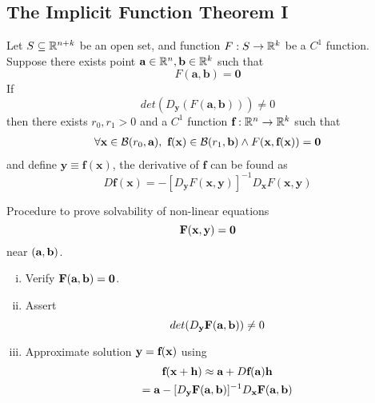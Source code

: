 \documentclass[11pt]{article}
\begin{document}
		\subsection{The Implicit Function Theorem I}
			\begin{theorem}
				Let $S \subseteq \mathbb{R}^{n+k}$ be an open set, and function $F: S \to \mathbb{R}^k$ be a $C^1$ function. Suppose there exists point $\textbf{a} \in \mathbb{R}^n, \textbf{b} \in \mathbb{R}^k$ such that 
				\begin{equation}
					F(\textbf{a}, \textbf{b}) = \textbf{0}
				\end{equation}
				If 
				\begin{equation}
					det(D_{\textbf{y}}(F(\textbf{a}, \textbf{b}))) \neq 0
				\end{equation}
				then there exists $r_0, r_1 > 0$ and a $C^1$ function $\textbf{f}: \mathbb{R}^n \to \mathbb{R}^k$ such that
				\begin{gather}
					\forall \ve{x} \in \mc{B}(r_0, \ve{a}),\ \ve{f}(\ve{x}) \in \mc{B}(r_1, \ve{b}) \land F(\ve{x}, \ve{f}(\ve{x})) = \ve{0}
				\end{gather}
				and define $\textbf{y} \equiv \textbf{f}(\textbf{x})$, the derivative of $\textbf{f}$ can be found as
				\begin{equation}
					D\textbf{f}(\textbf{x}) = -[D_{\textbf{y}}F(\textbf{x}, \textbf{y})]^{-1} D_{\textbf{x}}F(\textbf{x}, \textbf{y})
				\end{equation}
			\end{theorem}
			\begin{remark}
				Procedure to prove solvability of non-linear equations
				\begin{equation}
					\textbf{F}(\textbf{x}, \textbf{y}) = \textbf{0}
				\end{equation}
				near $(\textbf{a}, \textbf{b})$.
				\begin{enumerate}[(i)]
					\item Verify $\textbf{F}(\textbf{a}, \textbf{b}) = \textbf{0}$.
					\item Assert
					\begin{equation}
						det(D_{\textbf{y}}\textbf{F}(\textbf{a}, \textbf{b})) \neq 0
					\end{equation}
					\item Approximate solution $\textbf{y} = \textbf{f}(\textbf{x})$ using 
					\begin{gather}
						\textbf{f}(\textbf{x} + \textbf{h}) \approx \textbf{a} + D\textbf{f}(\textbf{a}) \textbf{h} \\
						= \textbf{a}
						- [D_{\textbf{y}} \textbf{F}(\textbf{a}, \textbf{b})]^{-1}
						D_{\textbf{x}} \textbf{F}(\textbf{a}, \textbf{b})
					\end{gather}
				\end{enumerate}
			\end{remark}
\end{document}
